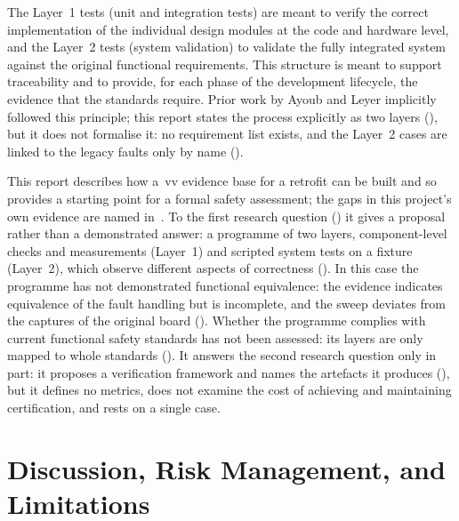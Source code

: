 The Layer~1 tests (unit and integration tests) are meant to verify the correct implementation of the individual design modules at the code and hardware level, and the Layer~2 tests (system validation) to validate the fully integrated system against the original functional requirements. This structure is meant to support traceability and to provide, for each phase of the development lifecycle, the evidence that the standards require. Prior work by Ayoub and Leyer implicitly followed this principle; this report states the process explicitly as two layers (), but it does not formalise it: no requirement list exists, and the Layer~2 cases are linked to the legacy faults only by name ().

This report describes how a~\gls{vv} evidence base for a retrofit can be built and so provides a starting point for a formal safety assessment; the gaps in this project's own evidence are named in~. To the first research question () it gives a proposal rather than a demonstrated answer: a programme of two layers, component-level checks and measurements (Layer~1) and scripted system tests on a fixture (Layer~2), which observe different aspects of correctness (). In this case the programme has not demonstrated functional equivalence: the evidence indicates equivalence of the fault handling but is incomplete, and the sweep deviates from the captures of the original board (). Whether the programme complies with current functional safety standards has not been assessed: its layers are only mapped to whole standards (). It answers the second research question only in part: it proposes a verification framework and names the artefacts it produces (), but it defines no metrics, does not examine the cost of achieving and maintaining certification, and rests on a single case.

\section{Discussion, Risk Management, and Limitations}
\label{sec:results_discussion_risk}

